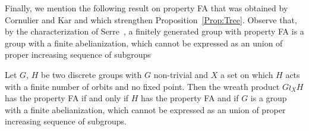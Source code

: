 Finally, we mention the following result on property FA that was obtained by Cornulier and Kar and which strengthen Proposition~\ref{Prop:Tree}.
Observe that, by the characterization of Serre~\cite{MR0476875}, a finitely generated group with property FA is a group with a finite abelianization, which cannot be expressed as an union of proper increasing sequence of subgroups 
\begin{thm}
Let $G$, $H$ be two discrete groups with $G$ non-trivial and $X$ a set on which $H$ acts with a finite number of orbits and no fixed point. Then the wreath product $G \wr_X H$ has the property FA if and only if $H$ has the property FA and if $G$ is a group with a finite abelianization, which cannot be expressed as an union of proper increasing sequence of subgroups.
\end{thm}

